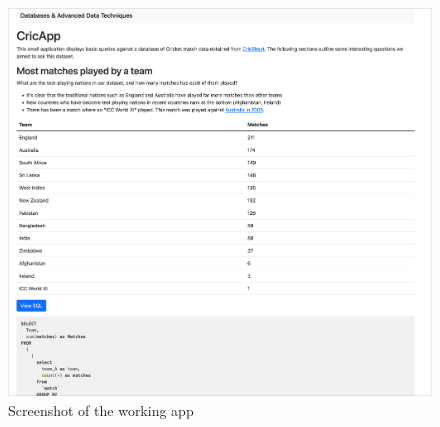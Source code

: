 \begin{figure}[H]
    \centering
    \includegraphics[width=\textwidth]{appshot}
    \caption{Screenshot of the working app}
    \label{fig:appshot}
\end{figure}





